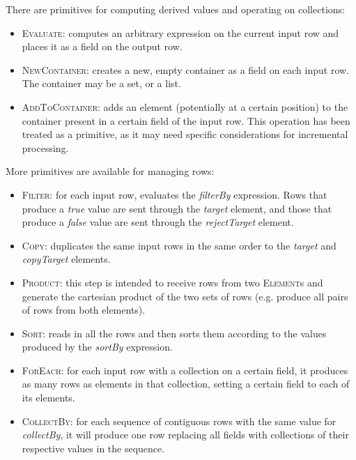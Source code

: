 \documentclass[a4paper]{scrartcl}
\newcommand*{\class}[1]{\textsc{#1}}
\begin{document}
There are primitives for computing derived values and operating on
collections:

\begin{itemize}
\item \class{Evaluate}: computes an arbitrary expression on the
  current input row and places it as a field on the output row.

\item \class{NewContainer}: creates a new, empty container as a field
  on each input row. The container may be a set, or a list.

\item \class{AddToContainer}: adds an element (potentially at a
  certain position) to the container present in a certain field of the
  input row. This operation has been treated as a primitive, as it may
  need specific considerations for incremental processing.
\end{itemize}

More primitives are available for managing rows:

\begin{itemize}
\item \class{Filter}: for each input row, evaluates the
  \emph{filterBy} expression. Rows that produce a \emph{true} value
  are sent through the \emph{target} element, and those that produce a
  \emph{false} value are sent through the \emph{rejectTarget} element.

\item \class{Copy}: duplicates the same input rows in the same order
  to the \emph{target} and \emph{copyTarget} elements.

\item \class{Product}: this step is intended to receive rows from two
  \class{Element}s and generate the cartesian product of the two sets
  of rows (e.g. produce all pairs of rows from both elements).

\item \class{Sort}: reads in all the rows and then sorts them
  according to the values produced by the \emph{sortBy} expression.

\item \class{ForEach}: for each input row with a collection on a
  certain field, it produces as many rows as elements in that
  collection, setting a certain field to each of its elements.

\item \class{CollectBy}: for each sequence of contiguous rows with the
  same value for \emph{collectBy}, it will produce one row replacing
  all fields with collections of their respective values in the
  sequence.
\end{itemize}
\end{document}
